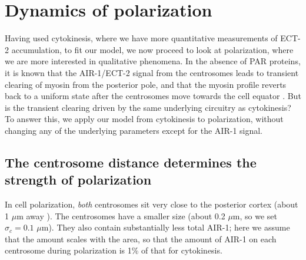 \documentclass[11pt]{article}
\begin{document}
\section{Dynamics of polarization}
Having used cytokinesis, where we have more quantitative measurements of ECT-2 accumulation, to fit our model, we now proceed to look at polarization, where we are more interested in qualitative phenomena. In the absence of PAR proteins, it is known that the AIR-1/ECT-2 signal from the centrosomes leads to transient clearing of myosin from the posterior pole, and that the myosin profile reverts back to a uniform state after the centrosomes move towards the cell equator \cite[Fig.~2E]{gross2019guiding}. But is the transient clearing driven by the same underlying circuitry as cytokinesis? To answer this, we apply our model from cytokinesis to polarization, without changing any of the underlying parameters except for the AIR-1 signal.

\subsection{The centrosome distance determines the strength of polarization \label{sec:airpol}}
In cell polarization, \emph{both} centrosomes sit very close to the posterior cortex (about 1 $\mu$m away \cite{cowan2004centrosomes}). The centrosomes have a smaller size (about 0.2 $\mu$m, so we set $\sigma_c=0.1$ $\mu$m). They also contain substantially less total AIR-1; here we assume that the amount scales with the area, so that the amount of AIR-1 on each centrosome during polarization is 1\% of that for cytokinesis. 
\end{document}
